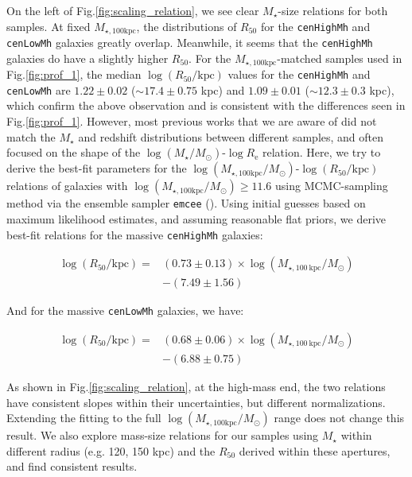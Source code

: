 \documentclass{emulateapj}
\def\rbcg{\texttt{cenHighMh}}
\def\nbcg{\texttt{cenLowMh}}
\def\mstar{{$M_{\star}$}}
\def\logms{{$\log (M_{\star}/M_{\odot})$}}
\def\mtot{{$M_{\star,100\mathrm{kpc}}$}}
\def\logmtot{{$\log (M_{\star,100\mathrm{kpc}}/M_{\odot})$}}
\begin{document}
\begin{CJK*}{UTF8}{gbsn}
    On the left of Fig.\ref{fig:scaling_relation}, we see clear \mstar{}-size relations for both samples.  
    At fixed \mtot{}, the distributions of $R_{\mathrm{50}}$ for the \rbcg{} and
    \nbcg{} galaxies greatly overlap.  
    Meanwhile, it seems that the \rbcg{} galaxies do have a slightly higher 
    $R_{\mathrm{50}}$. 
    For the \mtot{}-matched samples used in Fig.\ref{fig:prof_1}, the median 
    $\log (R_{\mathrm{50}}/\mathrm{kpc})$ values for the \rbcg{} and \nbcg{} are 
    $1.22\pm 0.02$ ($\sim 17.4\pm 0.75$ kpc) and $1.09\pm 0.01$ 
    ($\sim 12.3\pm0.3$ kpc), which confirm the above observation and is consistent with 
    the differences seen in Fig.\ref{fig:prof_1}. 
    However, most previous works that we are aware of did not match the \mstar{} 
    and redshift distributions between different samples, and often focused on the shape 
    of the \logms{}-$\log R_{\mathrm{e}}$ relation.  
    Here, we try to derive the best-fit parameters for the 
    \logmtot{}-$\log (R_{\mathrm{50}}/\mathrm{kpc})$ relations of galaxies with 
    \logmtot{}$\geq 11.6$ using MCMC-sampling method via the ensemble sampler 
    \texttt{emcee} (\citealt{Emcee}). 
    Using initial guesses based on maximum likelihood estimates, and assuming reasonable 
    flat priors, we derive best-fit relations for the massive \rbcg{} galaxies:
    
    \begin{equation}
        \begin{aligned}
        \log (R_{\mathrm{50}}/\mathrm{kpc}) = & (0.73\pm0.13) \times \log (M_{\star, 100\ \mathrm{kpc}}/M_{\odot}) \\ & -(7.49\pm1.56)
        \end{aligned}
    \end{equation}

    \noindent And for the massive \nbcg{} galaxies, we have:
    
    \begin{equation}
        \begin{aligned}
        \log (R_{\mathrm{50}}/\mathrm{kpc}) = & (0.68\pm0.06) \times \log (M_{\star, 100\ \mathrm{kpc}}/M_{\odot}) \\ & -(6.88\pm0.75)
        \end{aligned}
    \end{equation}
    
    \noindent As shown in Fig.\ref{fig:scaling_relation}, at the high-mass end, the two relations 
    have consistent slopes within their uncertainties, but different normalizations. 
    Extending the fitting to the full \logmtot{} range does not change this result. 
    We also explore mass-size relations for our samples using \mstar{} within different 
    radius (e.g. 120, 150 kpc) and the $R_{\mathrm{50}}$ derived within these apertures, 
    and find consistent results.
    

\end{CJK*}
\end{document}
